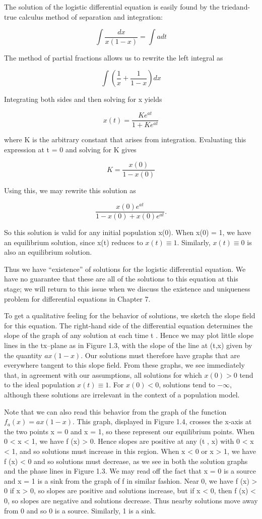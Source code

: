 \documentclass{article}
\begin{document}
The solution of the logistic differential equation is easily found by the triedand-true calculus method of separation and integration:

\[
\int \frac{dx}{x(1-x)} = \int a dt
\]

The method of partial fractions allows us to rewrite the left integral as

\[
\int (\frac{1}{x} + \frac{1}{1-x}) dx
\]

Integrating both sides and then solving for x yields

\[
x(t) = \frac{K e^{at}}{1+ Ke^{at}}
\]

where K is the arbitrary constant that arises from integration. Evaluating this
expression at t = 0 and solving for K gives

\[
K = \frac{x(0)}{1 - x(0)}
\]

Using this, we may rewrite this solution as

\[
\frac{x(0)e^{at}}{1 - x(0) + x(0)e^{at}} .
\]


So this solution is valid for any initial population x(0). When x(0) = 1,
we have an equilibrium solution, since x(t) reduces to $x(t) \equiv 1$. Similarly,
$x(t) \equiv 0$ is also an equilibrium solution.

Thus we have “existence” of solutions for the logistic differential equation.
We have no guarantee that these are all of the solutions to this equation at this
stage; we will return to this issue when we discuss the existence and uniqueness
problem for differential equations in Chapter 7.

To get a qualitative feeling for the behavior of solutions, we sketch the
slope field for this equation. The right-hand side of the differential equation
determines the slope of the graph of any solution at each time t . Hence we
may plot little slope lines in the tx–plane as in Figure 1.3, with the slope of the
line at (t,x) given by the quantity $ax(1 - x)$. Our solutions must therefore
have graphs that are everywhere tangent to this slope field. From these graphs,
we see immediately that, in agreement with our assumptions, all solutions
for which $x(0) > 0$ tend to the ideal population $x(t) \equiv 1$. For $x(0) < 0$,
solutions tend to $- \infty$, although these solutions are irrelevant in the context
of a population model.

Note that we can also read this behavior from the graph of the function
$f_a(x) = ax(1 - x)$. This graph, displayed in Figure 1.4, crosses the x-axis at
the two points x = 0 and x = 1, so these represent our equilibrium points.
When 0 < x < 1, we have f (x) > 0. Hence slopes are positive at any (t , x)
with 0 < x < 1, and so solutions must increase in this region. When x < 0 or
x > 1, we have f (x) < 0 and so solutions must decrease, as we see in both the
solution graphs and the phase lines in Figure 1.3.
We may read off the fact that x = 0 is a source and x = 1 is a sink from
the graph of f in similar fashion. Near 0, we have f (x) > 0 if x > 0, so slopes
are positive and solutions increase, but if x < 0, then f (x) < 0, so slopes are
negative and solutions decrease. Thus nearby solutions move away from 0 and
so 0 is a source. Similarly, 1 is a sink.
\end{document}
